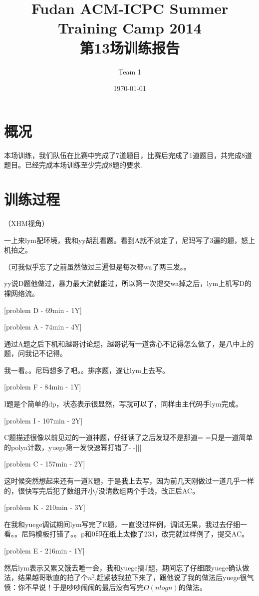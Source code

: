 \documentclass[a4paper, 11pt, nofonts, nocap, fancyhdr]{ctexart}
\title{Fudan ACM-ICPC Summer Training Camp 2014\\第13场训练报告}
\author{Team 1}
\date{\today}
\begin{document}
\maketitle

\section{概况}

本场训练，我们队伍在比赛中完成了7道题目，比赛后完成了1道题目，共完成8道题目。已经完成本场训练至少完成8题的要求.

\section{训练过程}

（XHM视角）

一上来lym配环境，我和yy胡乱看题。看到A就不淡定了，尼玛写了3遍的题，怒上机拍之。

（可我似乎忘了之前虽然做过三遍但是每次都wa了两三发。。

yy说D题他做过，暴力最大流就能过，所以第一次提交wa掉之后，lym上机写D的裸网络流。

[problem D - 69min - 1Y]

[problem A - 74min - 4Y]

通过A题之后下机和越哥讨论题，越哥说有一道贪心不记得怎么做了，是八中上的题，问我记不记得。

我一看。。尼玛想多了吧。。排序题，遂让lym上去写。

[problem F - 84min - 1Y]

I题是个简单的dp，状态表示很显然，写就可以了，同样由主代码手lym完成。

[problem I - 107min - 2Y]

C题描述很像以前见过的一道神题，仔细读了之后发现不是那道= =只是一道简单的polya计数，yuege第一发快速幂打错了- -|||

[problem C - 157min - 2Y]

这时候突然想起来还有一道K题，于是我上去写，因为前几天刚做过一道几乎一样的，很快写完后犯了数组开小/没清数组两个手贱，改正后AC。

[problem K - 210min - 3Y]

在我和yuege调试期间lym写完了E题，一直没过样例，调试无果，我过去仔细一看。。尼玛模板打错了。。p和0印在纸上太像了233，改完就过样例了，提交AC。

[problem E - 216min - 1Y]

然后lym表示又累又饿去睡一会，我和yuege搞J题，期间忘了仔细跟yuege确认做法，结果越哥耿直的拍了个$n^2$,赶紧被我拉下来了，跟他说了我的做法后yuege很气愤：你不早说！于是吵吵闹闹的最后没有写完$O(nlogn)$的做法。
\end{document}
